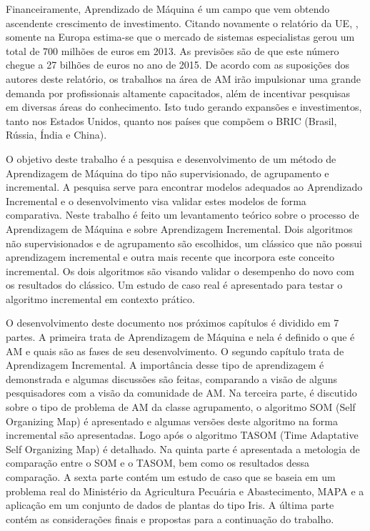 Financeiramente, Aprendizado de Máquina é um campo que vem obtendo ascendente crescimento de investimento. Citando novamente o relatório da UE, , somente na Europa estima-se que o mercado de sistemas especialistas gerou um total de 700 milhões de euros em 2013. As previsões são de que este número chegue a 27 bilhões de euros no ano de 2015. De acordo com as suposições dos autores deste relatório, os trabalhos na área de AM irão impulsionar uma grande demanda por profissionais altamente capacitados, além de incentivar pesquisas em diversas áreas do conhecimento. Isto tudo gerando expansões e investimentos, tanto nos Estados Unidos, quanto nos países que compõem o BRIC (Brasil, Rússia, Índia e China). 

O objetivo deste trabalho é a pesquisa e desenvolvimento de um método de Aprendizagem de Máquina do tipo não supervisionado, de agrupamento e incremental. A pesquisa serve para encontrar modelos adequados ao Aprendizado Incremental e o desenvolvimento visa validar estes modelos de forma comparativa. Neste trabalho é feito um levantamento teórico sobre o processo de Aprendizagem de Máquina e sobre Aprendizagem Incremental. Dois algoritmos não supervisionados e de agrupamento são escolhidos, um clássico que não possui aprendizagem incremental e outra mais recente que incorpora este conceito incremental. Os dois algoritmos são visando validar o desempenho do novo com os resultados do clássico. Um estudo de caso real é apresentado para testar o algoritmo incremental em contexto prático.

O desenvolvimento deste documento nos próximos capítulos é dividido em 7 partes. A primeira  trata de Aprendizagem de Máquina e nela é definido o que é AM e quais são as fases de seu desenvolvimento. O segundo capítulo trata de Aprendizagem Incremental. A importância desse tipo de aprendizagem é demonstrada e algumas discussões são feitas, comparando a visão de alguns pesquisadores com a visão da comunidade de AM. Na terceira parte, é discutido sobre o tipo de problema de AM da classe agrupamento, o algoritmo SOM (Self Organizing Map) é apresentado e algumas versões deste algoritmo na forma incremental são apresentadas. Logo após o algoritmo TASOM (Time Adaptative Self Organizing Map) é detalhado. Na quinta parte é apresentada a metologia de comparação entre o SOM e o TASOM, bem como os resultados dessa comparação. A sexta parte contém um estudo de caso que se baseia em um problema real do Ministério da Agricultura Pecuária e Abastecimento, MAPA e a aplicação em um conjunto de dados de plantas do tipo Iris. A última parte contém as considerações finais e propostas para a continuação do trabalho.





